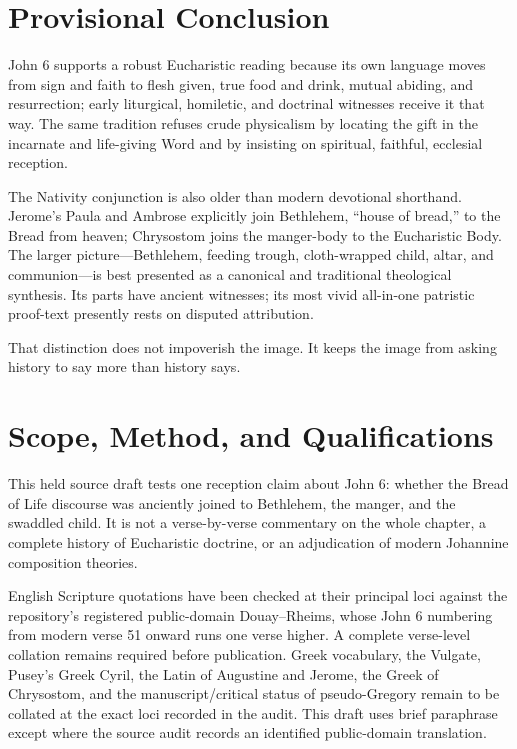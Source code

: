 \begin{deepstudy}
\section{Provisional Conclusion}

John 6 supports a robust Eucharistic reading because its own language moves
from sign and faith to flesh given, true food and drink, mutual abiding, and
resurrection; early liturgical, homiletic, and doctrinal witnesses receive it
that way. The same tradition refuses crude physicalism by locating the gift in
the incarnate and life-giving Word and by insisting on spiritual, faithful,
ecclesial reception.

The Nativity conjunction is also older than modern devotional shorthand.
Jerome's Paula and Ambrose explicitly join Bethlehem, ``house of bread,'' to
the Bread from heaven; Chrysostom joins the manger-body to the Eucharistic
Body. The larger picture---Bethlehem, feeding trough, cloth-wrapped child,
altar, and communion---is best presented as a canonical and traditional
theological synthesis. Its parts have ancient witnesses; its most vivid
all-in-one patristic proof-text presently rests on disputed attribution.

That distinction does not impoverish the image. It keeps the image from asking
history to say more than history says.

\appendix
\section{Scope, Method, and Qualifications}

This held source draft tests one reception claim about John 6: whether the
Bread of Life discourse was anciently joined to Bethlehem, the manger, and the
swaddled child. It is not a verse-by-verse commentary on the whole chapter, a
complete history of Eucharistic doctrine, or an adjudication of modern
Johannine composition theories.

English Scripture quotations have been checked at their principal loci against
the repository's registered public-domain Douay--Rheims, whose John 6 numbering
from modern verse 51 onward runs one verse higher. A complete verse-level
collation remains required before publication. Greek vocabulary,
the Vulgate, Pusey's Greek Cyril, the Latin of Augustine and Jerome, the Greek
of Chrysostom, and the manuscript/critical status of pseudo-Gregory remain to
be collated at the exact loci recorded in the audit. This draft uses brief
paraphrase except where the source audit records an identified public-domain
translation.


\end{deepstudy}
